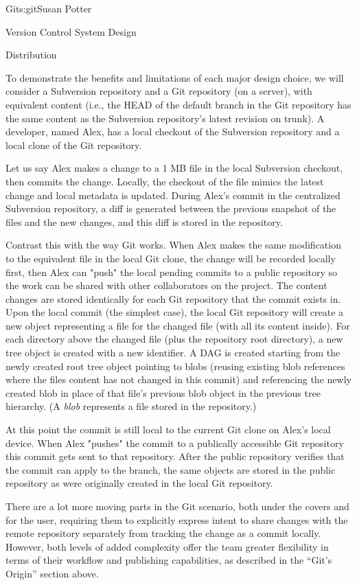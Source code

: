 \begin{aosachapter}{Git}{s:git}{Susan Potter}
\begin{aosasect1}{Version Control System Design}
\begin{aosasect2}{Distribution}
\end{aosasect2}

To demonstrate the benefits and limitations of each major design choice,
 we will consider a Subversion repository and a Git repository
(on a server), with equivalent content (i.e., the HEAD of the default
branch in the Git repository has the same content as the Subversion
repository's latest revision on trunk). A developer, named Alex,
has a local checkout of the Subversion repository and a local clone of the
Git repository.

Let us say Alex makes a change to a 1 MB file in the local Subversion
checkout, then commits the change. Locally, the checkout of the file mimics
the latest change and local metadata is updated. During Alex's commit in the centralized
Subversion repository, a diff is generated between the
previous snapshot of the files and the new changes, and this diff is stored
in the repository.

Contrast this with the way Git works.
When Alex makes the same modification to the equivalent file in the local
Git clone, the change will be recorded locally first, then Alex can "push"
the local pending commits to a public repository so the work can be shared
with other collaborators on the project. The content changes are
stored identically for each Git repository that the commit exists in. Upon
the local commit (the simplest case), the local Git repository will create a
new object representing a file for the changed file (with all its content
inside). For each directory above the changed file (plus the repository
root directory), a new tree object is created with a new identifier. A DAG
is created starting from the newly created root tree object pointing to
blobs (reusing existing blob references where the files content has not
changed in this commit) and referencing the newly created blob in place
of that file's previous blob object in the previous tree hierarchy. 
(A \emph{blob} represents
a file stored in the repository.) 

At this
point the commit is still local to the current Git clone on Alex's
local device. When Alex "pushes" the commit to a publically accessible
Git repository this commit gets sent to that repository. After the public
repository verifies that the commit can apply to the branch, the same objects
are stored in the public repository as were originally created in the
local Git repository.

There are a lot more moving parts in the Git scenario, both under the
covers and for the user, requiring them to explicitly express intent to share
changes with the remote repository separately from tracking the change as a
commit locally. However, both levels of added complexity offer the team
greater flexibility in terms of their
workflow and publishing capabilities, as described in the ``Git's Origin'' section
above.


\end{aosasect1}
\end{aosachapter}
